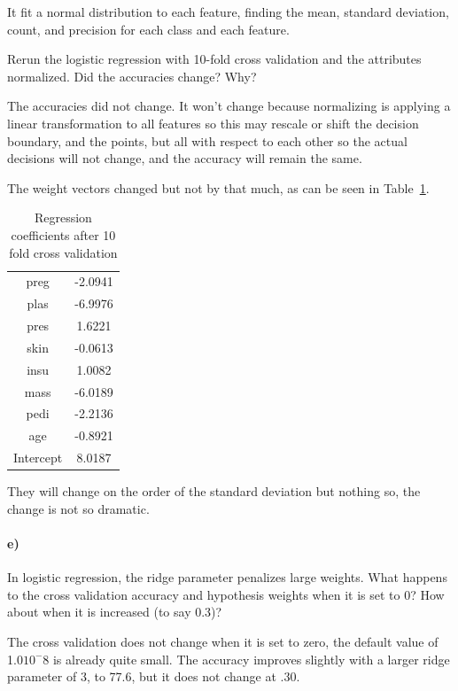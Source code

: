 \documentclass{article}
\begin{document}
It fit a normal distribution to each feature, finding the mean, standard deviation, count, and precision for each class and each feature. 

Rerun the logistic regression with 10-fold cross validation and the attributes normalized. Did the accuracies change? Why?

The accuracies did not change. It won't change because normalizing is applying a linear transformation to all features so this may rescale or shift the decision boundary, and the points, but all with respect to each other so the actual decisions will not change, and the accuracy will remain the same. 

The weight vectors changed but not by that much, as can be seen in Table~\ref{tab:coeffscv}.
\begin{table}[ht]
    \begin{center}
    \begin{tabular}{|c|c|}
   \hline
preg&                 -2.0941\\
plas   &              -6.9976\\
pres  &                1.6221\\
skin   &              -0.0613\\
insu  &                1.0082\\
mass  &               -6.0189\\
pedi   &              -2.2136\\
age   &               -0.8921\\   \hline
Intercept      &       8.0187   \\     \hline
    \end{tabular} \caption{Regression coefficients after 10 fold cross validation}\label{tab:coeffscv}
    \end{center}
\end{table}
They will change on the order of the standard deviation but nothing so, the change is not so dramatic. 

\paragraph{e)}
In logistic regression, the ridge parameter penalizes large weights. What happens to the cross validation accuracy and hypothesis weights when it is set to 0? How about when it is increased (to say 0.3)?

The cross validation does not change when it is set to zero, the default value of 1.0$10^-8$ is already quite small. The accuracy improves slightly with a larger ridge parameter of 3, to 77.6, but it does not change at .30. 
\end{document}
